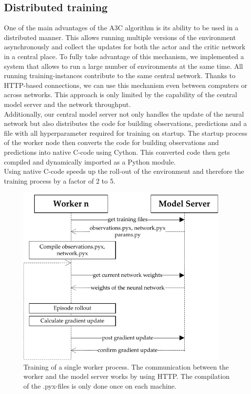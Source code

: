 \subsection*{Distributed training}
One of the main advantages of the A3C algorithm is its ability to be used in a distributed manner. This allows running multiple versions of the environment asynchronously and collect the updates for both the actor and the critic network in a central place. To fully take advantage of this mechanism, we implemented a system that allows to run a large number of environments at the same time. All running training-instances contribute to the same central network. Thanks to HTTP-based connections, we can use this mechanism even between computers or across networks. This approach is only limited by the capability of the central model server and the network throughput.\\
Additionally, our central model server not only handles the update of the neural network but also distributes the code for building observations, predictions and a file with all hyperparameter required for training on startup. The startup process of the worker node then converts the code for building observations and predictions into native C-code using Cython. This converted code then gets compiled and dynamically imported as a Python module.\\
Using native C-code speeds up the roll-out of the environment and therefore the training process by a factor of 2 to 5.
\begin{figure}[H]
	\centering
	\includegraphics[width=300pt]{diagrams/distributed_training_update_2.pdf}
	\caption{Training of a single worker process. The communication between the worker and the model server works by using HTTP. The compilation of the .pyx-files is only done once on each machine.}
	\label{obs_descr} %
\end{figure}
